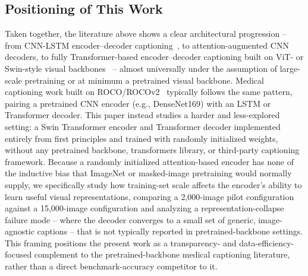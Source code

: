 \subsection{Positioning of This Work}
Taken together, the literature above shows a clear architectural progression -- from CNN-LSTM encoder--decoder captioning~\cite{vinyals2015show,xu2015show,ijraset2022}, to attention-augmented CNN decoders, to fully Transformer-based encoder--decoder captioning built on ViT- or Swin-style visual backbones~\cite{dosovitskiy2020vit,liu2021swin,lee2022cross,fadhilah2026transformer} -- almost universally under the assumption of large-scale pretraining or at minimum a pretrained visual backbone. Medical captioning work built on ROCO/ROCOv2~\cite{pelka2018roco,ruckert2024rocov2,ruckert2023imageclef} typically follows the same pattern, pairing a pretrained CNN encoder (e.g., DenseNet169) with an LSTM or Transformer decoder. This paper instead studies a harder and less-explored setting: a Swin Transformer encoder and Transformer decoder implemented entirely from first principles and trained with randomly initialized weights, without any pretrained backbone, transformers library, or third-party captioning framework. Because a randomly initialized attention-based encoder has none of the inductive bias that ImageNet or masked-image pretraining would normally supply, we specifically study how training-set scale affects the encoder's ability to learn useful visual representations, comparing a 2,000-image pilot configuration against a 15,000-image configuration and analyzing a representation-collapse failure mode -- where the decoder converges to a small set of generic, image-agnostic captions -- that is not typically reported in pretrained-backbone settings. This framing positions the present work as a transparency- and data-efficiency-focused complement to the pretrained-backbone medical captioning literature, rather than a direct benchmark-accuracy competitor to it.

